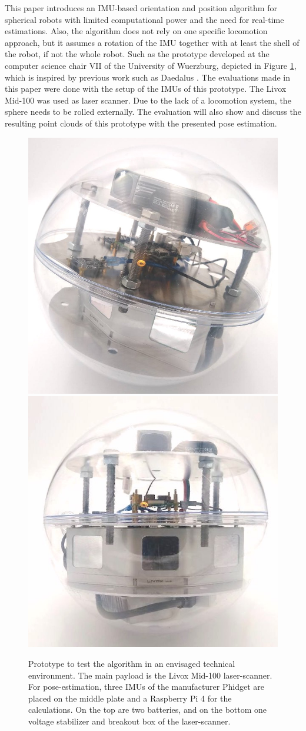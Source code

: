\documentclass[letterpaper, 10 pt, conference]{ieeeconf}  %
\begin{document}
This paper introduces an IMU-based orientation and position algorithm for spherical robots with limited computational power and the need for real-time estimations.
Also, the algorithm does not rely on one specific locomotion approach, but it assumes a rotation of the IMU together with at least the shell of the robot, if not the whole robot. 
Such as the prototype developed at the computer science chair VII of the University of Wuerzburg,  depicted in Figure \ref{fig:prototype}, which is inspired by previous work such as Daedalus \cite{rossi2021daedalus}.
The evaluations made in this paper were done with the setup of the IMUs of this prototype.
The Livox Mid-100 was used as laser scanner.
Due to the lack of a locomotion system, the sphere needs to be rolled externally. 
The evaluation will also show and discuss the resulting point clouds of this prototype with the presented pose estimation.
\begin{figure}[b]
\includegraphics[width=0.49\linewidth]{./graphics/photoReal1.jpeg}
\includegraphics[width=0.50\linewidth]{./graphics/photoReal3.jpeg}
\caption{Prototype to test the algorithm in an envisaged technical environment. The main payload is the Livox Mid-100 laser-scanner. For pose-estimation, three IMUs of the manufacturer Phidget are placed on the middle plate and a Raspberry Pi 4 for the calculations. On the top are two batteries, and on the bottom one voltage stabilizer and breakout box of the laser-scanner. }
\label{fig:prototype}
\end{figure}
\end{document}
